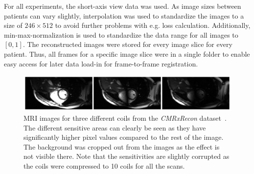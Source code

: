 For all experiments, the short-axis view data was used. As image sizes between patients can vary slightly, interpolation was used to standardize the images to a size of $246 \times 512$ to avoid further problems with e.g. 
loss calculation. Additionally, min-max-normalization is used to standardize the data range for all images to $[0,1]$. The reconstructed images were stored for every image slice for every patient. Thus, all frames for a specific image slice were in a single folder to enable easy access for later data load-in for frame-to-frame registration.

\begin{figure}[h]%
	\centering
	\graphicspath{{images/}{\main/images/}}
	\includegraphics[width=\linewidth]{Coils.png} 
	\caption{MRI images for three different coils from the \emph{CMRxRecon} dataset~\cite{CMRxRecon}. The different sensitive areas can clearly be seen as they have significantly higher pixel values compared to the rest of the image. The background was cropped out from the images as the effect is not visible there. Note that the sensitivities are slightly corrupted as the coils were compressed to 10 coils for all the scans.}
	\label{fig:Coils}
\end{figure}


